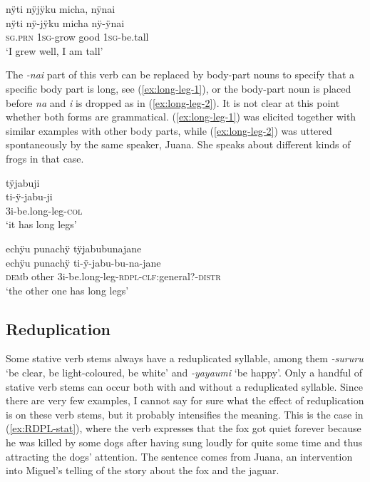 \ea\label{ex:be-tall}
\begingl
\glpreamble nÿti nÿjÿku micha, nÿnai\\
\gla nÿti nÿ-jÿku micha nÿ-ÿnai\\
\textsc{sg.prn} 1\textsc{sg}-grow good 1\textsc{sg}-be.tall\\
\glft ‘I grew well, I am tall’
\endgl
\trailingcitation{[jxx-p150920l.057]}%
\xe


The \textit{-nai} part of this verb can be replaced by body-part nouns to specify that a specific body part is long, see (\ref{ex:long-leg-1}), or the body-part noun is placed before \textit{na} and \textit{i} is dropped as in (\ref{ex:long-leg-2}). It is not clear at this point whether both forms are grammatical. (\ref{ex:long-leg-1}) was elicited together with similar examples with other body parts, while (\ref{ex:long-leg-2}) was uttered spontaneously by the same speaker, Juana. She speaks about different kinds of frogs in that case.

\ea\label{ex:long-leg-1}
\begingl
\glpreamble tÿjabuji\\
\gla ti-ÿ-jabu-ji\\
\glb 3i-be.long-leg-\textsc{col}\\
\glft ‘it has long legs’
\endgl
\trailingcitation{[jxx-e150925l-1.047]}
\xe


\ea\label{ex:long-leg-2}
\begingl
\glpreamble echÿu punachÿ tÿjabubunajane\\
\gla echÿu punachÿ ti-ÿ-jabu-bu-na-jane\\
\glb \textsc{dem}b other 3i-be.long-leg-\textsc{rdpl}-\textsc{clf:}general?-\textsc{distr}\\
\glft ‘the other one has long legs’
\endgl
\trailingcitation{[jxx-a120516l-a.463]}
\xe

%


\subsection{Reduplication}\label{sec:StativeVerbs_RDPL}

Some stative verb stems always have a reduplicated syllable, among them \textit{-sururu} ‘be clear, be light-coloured, be white’ and \textit{-yayaumi} ‘be happy’. Only a handful of stative verb stems can occur both with and without a reduplicated syllable. Since there are very few examples, I cannot say for sure what the effect of reduplication is on these verb stems, but it probably intensifies the meaning. This is the case in (\ref{ex:RDPL-stat}), where the verb expresses that the fox got quiet forever because he was killed by some dogs after having sung loudly for quite some time and thus attracting the dogs’ attention. The sentence comes from Juana, an intervention into Miguel’s telling of the story about the fox and the jaguar.

